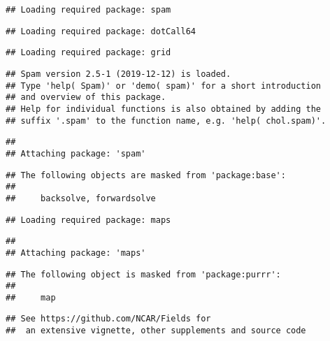 \documentclass[]{book}
\begin{document}
\begin{verbatim}
## Loading required package: spam
\end{verbatim}

\begin{verbatim}
## Loading required package: dotCall64
\end{verbatim}

\begin{verbatim}
## Loading required package: grid
\end{verbatim}

\begin{verbatim}
## Spam version 2.5-1 (2019-12-12) is loaded.
## Type 'help( Spam)' or 'demo( spam)' for a short introduction 
## and overview of this package.
## Help for individual functions is also obtained by adding the
## suffix '.spam' to the function name, e.g. 'help( chol.spam)'.
\end{verbatim}

\begin{verbatim}
## 
## Attaching package: 'spam'
\end{verbatim}

\begin{verbatim}
## The following objects are masked from 'package:base':
## 
##     backsolve, forwardsolve
\end{verbatim}

\begin{verbatim}
## Loading required package: maps
\end{verbatim}

\begin{verbatim}
## 
## Attaching package: 'maps'
\end{verbatim}

\begin{verbatim}
## The following object is masked from 'package:purrr':
## 
##     map
\end{verbatim}

\begin{verbatim}
## See https://github.com/NCAR/Fields for
##  an extensive vignette, other supplements and source code
\end{verbatim}
\end{document}

